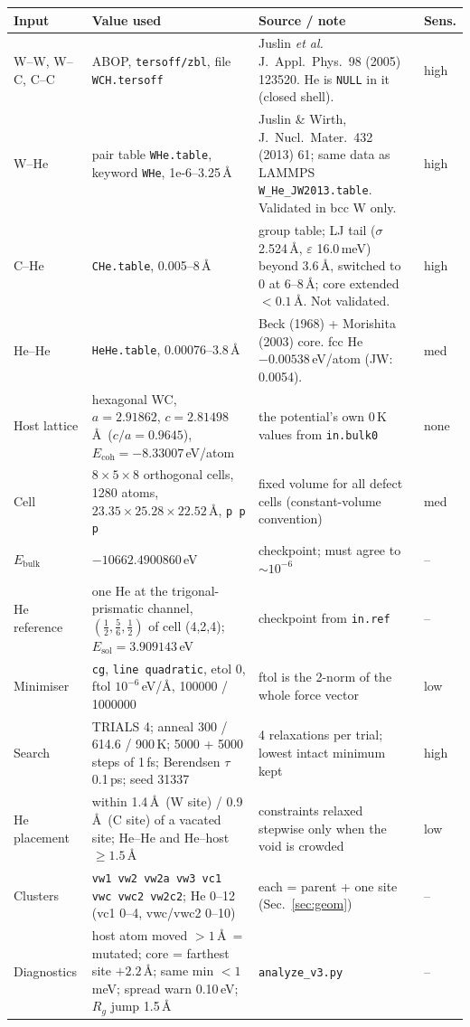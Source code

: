 \documentclass[10pt]{article}
\newcommand{\cmd}[1]{\texttt{\small #1}}
\newcommand{\Eblk}{E_\mathrm{bulk}}
\begin{document}
\begin{xltabular}{\linewidth}{L{3.1cm} L{7.4cm} Y L{1.2cm}}
\toprule
\textbf{Input} & \textbf{Value used} & \textbf{Source / note} & \textbf{Sens.} \\
\midrule\endhead
W--W, W--C, C--C & ABOP, \cmd{tersoff/zbl}, file \cmd{WCH.tersoff} & Juslin \emph{et al.} J.\ Appl.\ Phys.\ 98 (2005) 123520. He is \cmd{NULL} in it (closed shell). & high \\
W--He & pair table \cmd{WHe.table}, keyword \cmd{WHe}, 1e-6--3.25\,\AA & Juslin \& Wirth, J.\ Nucl.\ Mater.\ 432 (2013) 61; same data as LAMMPS \cmd{W\_He\_JW2013.table}. Validated in bcc W only. & high \\
C--He & \cmd{CHe.table}, 0.005--8\,\AA & group table; LJ tail ($\sigma$ 2.524\,\AA, $\varepsilon$ 16.0\,meV) beyond 3.6\,\AA, switched to 0 at 6--8\,\AA; core extended $<0.1$\,\AA. Not validated. & high \\
He--He & \cmd{HeHe.table}, 0.00076--3.8\,\AA & Beck (1968) + Morishita (2003) core. fcc He $-0.00538$\,eV/atom (JW: 0.0054). & med \\
Host lattice & hexagonal WC, $a=2.91862$, $c=2.81498$\,\AA\ ($c/a=0.9645$), $E_\mathrm{coh}=-8.33007$\,eV/atom & the potential's own 0\,K values from \cmd{in.bulk0} & none \\
Cell & $8\times5\times8$ orthogonal cells, 1280 atoms, $23.35\times25.28\times22.52$\,\AA, \cmd{p p p} & fixed volume for all defect cells (constant-volume convention) & med \\
$\Eblk$ & $-10662.4900860$\,eV & checkpoint; must agree to $\sim10^{-6}$ & -- \\
He reference & one He at the trigonal-prismatic channel, $(\tfrac12,\tfrac56,\tfrac12)$ of cell (4,2,4); $E_\mathrm{sol}=3.909143$\,eV & checkpoint from \cmd{in.ref} & -- \\
Minimiser & \cmd{cg}, \cmd{line quadratic}, etol 0, ftol $10^{-6}$\,eV/\AA, 100000 / 1000000 & ftol is the 2-norm of the whole force vector & low \\
Search & TRIALS 4; anneal 300 / 614.6 / 900\,K; 5000 + 5000 steps of 1\,fs; Berendsen $\tau$ 0.1\,ps; seed 31337 & 4 relaxations per trial; lowest intact minimum kept & high \\
He placement & within 1.4\,\AA\ (W site) / 0.9\,\AA\ (C site) of a vacated site; He--He and He--host $\ge1.5$\,\AA & constraints relaxed stepwise only when the void is crowded & low \\
Clusters & \cmd{vw1 vw2 vw2a vw3 vc1 vwc vwc2 vw2c2}; He 0--12 (vc1 0--4, vwc/vwc2 0--10) & each = parent + one site (Sec.~\ref{sec:geom}) & -- \\
Diagnostics & host atom moved $>1$\,\AA\ = mutated; core = farthest site $+2.2$\,\AA; same min $<1$\,meV; spread warn 0.10\,eV; $R_g$ jump 1.5\,\AA & \cmd{analyze\_v3.py} & -- \\
\bottomrule
\end{xltabular}
\end{document}
